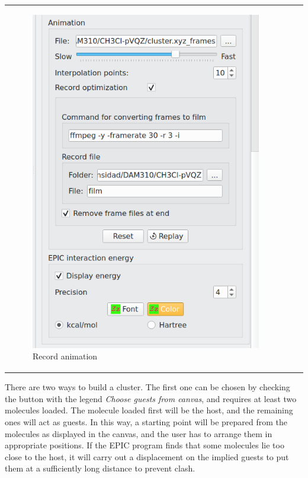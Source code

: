 \documentclass[10pt]{article}
\begin{document}
\begin{tabular}{lcr}
\begin{minipage}{.3\linewidth}
\begin{figure}[H]
    \begin{center}
        \vspace*{-4mm}
        \includegraphics[width=0.74\linewidth]{damqt320_mespimizer_3.png}
    \end{center}
    \vspace*{17mm}
    \caption{Record animation\label{fig:4_10_3}}
\end{figure}
\end{minipage}
\end{tabular}

\vspace*{5mm}

There are two ways to build a cluster. The first one can be chosen by 
checking the button with the legend {\it  Choose guests from canvas}, and
requires at least two molecules loaded. The molecule loaded 
first will be the host, and the remaining ones will act as guests.
In this way, a starting point will be prepared from the molecules as 
displayed in the canvas, and the user has to arrange them in appropriate 
positions. If the EPIC program finds that some molecules lie too close
to the host, 
it will carry out a displacement on the implied guests to put them at a 
sufficiently long distance to prevent clash.
\end{document}
